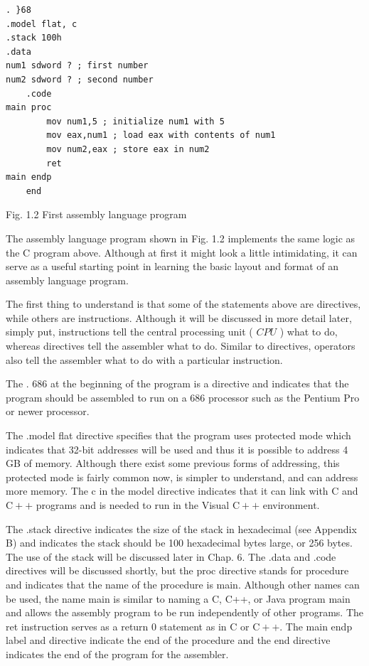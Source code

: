 \documentclass[10pt]{book}
\begin{document}
\begin{verbatim}
. }68
.model flat, c
.stack 100h
.data
num1 sdword ? ; first number
num2 sdword ? ; second number
    .code
main proc
        mov num1,5 ; initialize num1 with 5
        mov eax,num1 ; load eax with contents of num1
        mov num2,eax ; store eax in num2
        ret
main endp
    end
\end{verbatim}

Fig. 1.2 First assembly language program

The assembly language program shown in Fig. 1.2 implements the same logic as the C program above. Although at first it might look a little intimidating, it can serve as a useful starting point in learning the basic layout and format of an assembly language program.

The first thing to understand is that some of the statements above are directives, while others are instructions. Although it will be discussed in more detail later, simply put, instructions tell the central processing unit ( $C P U$ ) what to do, whereas directives tell the assembler what to do. Similar to directives, operators also tell the assembler what to do with a particular instruction.

The . 686 at the beginning of the program is a directive and indicates that the program should be assembled to run on a 686 processor such as the Pentium Pro or newer processor.

The .model flat directive specifies that the program uses protected mode which indicates that 32-bit addresses will be used and thus it is possible to address 4 GB of memory. Although there exist some previous forms of addressing, this protected mode is fairly common now, is simpler to understand, and can address more memory. The c in the model directive indicates that it can link with C and $\mathrm{C}++$ programs and is needed to run in the Visual $\mathrm{C}++$ environment.

The .stack directive indicates the size of the stack in hexadecimal (see Appendix B) and indicates the stack should be 100 hexadecimal bytes large, or 256 bytes. The use of the stack will be discussed later in Chap. 6. The .data and .code directives will be discussed shortly, but the proc directive stands for procedure and indicates that the name of the procedure is main. Although other names can be used, the name main is similar to naming a C, C++, or Java program main and allows the assembly program to be run independently of other programs. The ret instruction serves as a return 0 statement as in C or $\mathrm{C}++$. The main endp label and directive indicate the end of the procedure and the end directive indicates the end of the program for the assembler.
\end{document}
